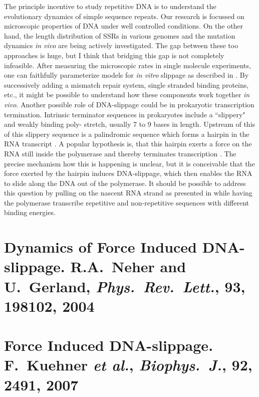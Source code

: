 The principle incentive to study repetitive DNA is to understand the evolutionary dynamics of simple
sequence repeats. Our research is focussed on microscopic properties of DNA under well controlled
conditions. On the other hand, the length distribution of SSRs in various 
genomes and the mutation dynamics \emph{in vivo} are being actively investigated. The gap between these too approaches is huge,
but I think that bridging this gap is not completely infeasible. After measuring the microscopic
rates in single molecule experiments, one can faithfully parameterize models for \emph{in vitro}
slippage as described in  \cite{Schloetterer_NAR_92}. By successively adding
a mismatch repair system, single stranded binding proteins, etc., it might be possible to understand
how these components work together \emph{in vivo}. 
Another possible role of DNA-slippage could be in prokaryotic transcription termination. 
Intrinsic terminator sequences in prokaryotes include a ``slippery" and weakly binding
poly- stretch, usually 7 to 9 bases in length. Upstream of this of this slippery 
sequence is a palindromic sequence which forms a hairpin in the RNA transcript \cite{Hippel_Science_98}.
A popular hypothesis is, that this hairpin exerts a force on the RNA still inside the polymerase and
thereby terminates transcription \cite{Dalal_MCell_06}. The precise mechanism how this is happening is
unclear, but it is conceivable that the force exerted by the hairpin induces DNA-slippage, which then enables the
RNA to slide along the DNA out of the polymerase. It should be possible to address this question by pulling
on the nascent RNA strand as presented in  while having the polymerase transcribe 
repetitive and non-repetitive sequences with different binding energies.

\cleardoublepage
\section[R.A.~Neher and U.~Gerland, \emph{Phys.~Rev.~Lett.}, {\bf 93}, 198102]{Dynamics of Force Induced DNA-slippage. R.A.~Neher and U.~Gerland, \emph{Phys.~Rev.~Lett.}, {\bf 93}, 198102, 2004}
\label{sec:Neher_PRL_04}
\clearpage
\addtocounter{page}{3}

\section[F.~Kuehner \emph{et al.}, \emph{Biophys.~J.}, {\bf 92}, 2491, 2007]{Force Induced DNA-slippage. F.~Kuehner \emph{et al.}, \emph{Biophys.~J.}, {\bf 92}, 2491, 2007}
\label{sec:Kuehner_BiophysJ_07}
\cleardoublepage
\addtocounter{page}{6}

